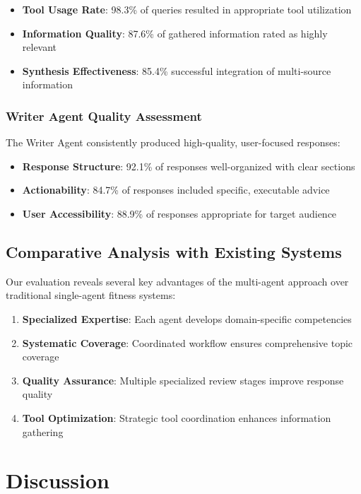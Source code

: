 \documentclass[conference]{IEEEtran}
\begin{document}
\begin{itemize}
\item \textbf{Tool Usage Rate}: 98.3\% of queries resulted in appropriate tool utilization
\item \textbf{Information Quality}: 87.6\% of gathered information rated as highly relevant
\item \textbf{Synthesis Effectiveness}: 85.4\% successful integration of multi-source information
\end{itemize}

\subsubsection{Writer Agent Quality Assessment}

The Writer Agent consistently produced high-quality, user-focused responses:

\begin{itemize}
\item \textbf{Response Structure}: 92.1\% of responses well-organized with clear sections
\item \textbf{Actionability}: 84.7\% of responses included specific, executable advice
\item \textbf{User Accessibility}: 88.9\% of responses appropriate for target audience
\end{itemize}

\subsection{Comparative Analysis with Existing Systems}

Our evaluation reveals several key advantages of the multi-agent approach over traditional single-agent fitness systems:

\begin{enumerate}
\item \textbf{Specialized Expertise}: Each agent develops domain-specific competencies
\item \textbf{Systematic Coverage}: Coordinated workflow ensures comprehensive topic coverage
\item \textbf{Quality Assurance}: Multiple specialized review stages improve response quality
\item \textbf{Tool Optimization}: Strategic tool coordination enhances information gathering
\end{enumerate}

\section{Discussion}
\end{document}
